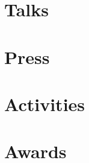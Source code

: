 \documentclass[margin,line]{res}
\begin{document}
\begin{resume}


\section{\sc Talks}



\section{\sc Press}



\section{\sc Activities}



\section{\sc Awards}



\end{resume}
\end{document}
